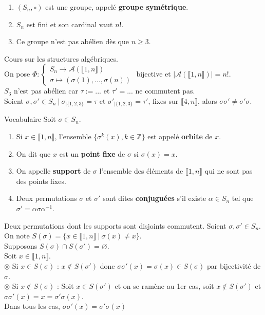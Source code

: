 \documentclass[11pt]{article}
\newcommand*{\Z}{\mathbb{Z}}
\newcommand*{\m}{\mathcal}
\newcommand*{\lb}{\llbracket}
\newcommand*{\rb}{\rrbracket}
\renewcommand*{\t}{\tau}
\newcommand{\0}{\varnothing}
\newcommand*{\s}{\sigma}
\begin{document}
\begin{prop}{}{}
    \begin{enumerate}[topsep=0pt,itemsep=-0.9 ex]
        \item $(S_n, \circ)$ est une groupe, appelé \textbf{groupe symétrique}.
        \item $S_n$ est fini et son cardinal vaut $n!$.
        \item Ce groupe n'est pas abélien dès que $n\geq3$.
    \end{enumerate}
    \tcblower
     Cours sur les structures algébriques.\\
     On pose $\Phi:\begin{cases}S_n\to\m{A}(\lb1,n\rb)\\\s\mapsto(\s(1),...,\s(n))\end{cases}$ bijective et $|\m{A}(\lb1,n\rb)|=n!$.\\
     $S_3$ n'est pas abélien car $\t:=...$ et $\t'=...$ ne commutent pas.\\
    Soient $\s,\s'\in S_n ~ | ~ \s_{|\{1,2,3\}}=\t$ et $\s'_{|\{1,2,3\}}=\t'$, fixes sur $\lb4,n\rb$, alors $\s\s'\neq\s'\s$.
\end{prop}

\begin{defi}{Vocabulaire}{}
    Soit $\s\in S_n$.
    \begin{enumerate}[topsep=0pt,itemsep=-0.9 ex]
        \item Si $x\in\lb1,n\rb$, l'ensemble $\{\s^k(x),k\in\Z\}$ est appelé \textbf{orbite} de $x$.
        \item On dit que $x$ est un \textbf{point fixe} de $\s$ si $\s(x)=x$. 
        \item On appelle \textbf{support} de $\s$ l'ensemble des éléments de $\lb1,n\rb$ qui ne sont pas des points fixes.
        \item Deux permutations $\s$ et $\s'$ sont dites \textbf{conjuguées} s'il existe $\alpha\in S_n$ tel que $\s'=\alpha\s\alpha^{-1}$.
    \end{enumerate}

\end{defi}

\begin{prop}{}{}
    Deux permutations dont les supports sont disjoints commutent.
    \tcblower
    Soient $\s,\s'\in S_n$. On note $S(\s)=\{x \in \lb1,n\rb ~ | ~ \s(x)\neq x\}$.\\
    Supposons $S(\s)\cap S(\s') = \0$.\\
    Soit $x\in\lb1,n\rb$.\\
    $\circledcirc$ Si $x\in S(\s)$ : $x\notin S(\s')$ donc $\s\s'(x)=\s(x)\in S(\s)$ par bijectivité de $\s$.\\
    $\circledcirc$ Si $x\notin S(\s)$ : Soit $x\in S(\s')$ et on se ramène au 1er cas, soit $x\notin S(\s')$ et $\s\s'(x)=x=\s'\s(x)$.\\
    Dans tous les cas, $\s\s'(x)=\s'\s(x)$
\end{prop}
\end{document}
